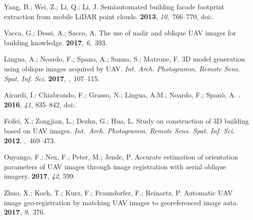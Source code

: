\documentclass[remotesensing,article,accept,moreauthors,pdftex,10pt,a4paper]{mdpi}
\theoremstyle{mdpi}
\newcounter{ex}
\newcounter{re}
\begin{document}
\begin{thebibliography}{999}
Yang, B.; Wei, Z.; Li, Q.; Li, J.
\newblock Semiautomated building facade footprint extraction from mobile LiDAR
  point clouds.
 {\bf 2013}, {\em
  10},~766--770,
\newblock
  doi:{\href{https://doi.org/10.1109/LGRS.2012.2222342}{}}.

Vacca, G.; Dessi, A.; Sacco, A.
\newblock The use of nadir and oblique UAV images for building knowledge.
 {\bf 2017}, {\em
  6},~393.

Lingua, A.; Noardo, F.; Spano, A.; Sanna, S.; Matrone, F.
\newblock 3D model generation using oblique images acquired by UAV. \emph{Int. Arch. Photogramm. Remote Sens. Spat. Inf. Sci.} {\bf 2017},
,~107--115.

{Aicardi}, I.; {Chiabrando}, F.; {Grasso}, N.; {Lingua}, A.M.; {Noardo}, F.;
  {Span{\`o}}, A.
.
 {\bf 2016}, \emph{41}, 835--842,
\newblock
  doi:{\href{https://doi.org/10.5194/isprs-archives-XLI-B1-835-2016}{}}.

Feifei, X.; Zongjian, L.; Dezhu, G.; Hua, L.
\newblock Study on construction of 3D building based on UAV images. \emph{Int.~Arch. Photogramm. Remote Sens. Spat. Inf. Sci.} {\bf 2012},
,~469--473.

Onyango, F.; Nex, F.; Peter, M.; Jende, P.
\newblock Accurate estimation of orientation parameters of UAV images through
  image registration with aerial oblique imagery.
 {\bf 2017}, {\em 42}, 599.

Zhuo, X.; Koch, T.; Kurz, F.; Fraundorfer, F.; Reinartz, P.
\newblock Automatic UAV image geo-registration by matching UAV images to
  georeferenced image aata.
 {\bf 2017}, {\em 9},~376.


\end{thebibliography}
\end{document}
